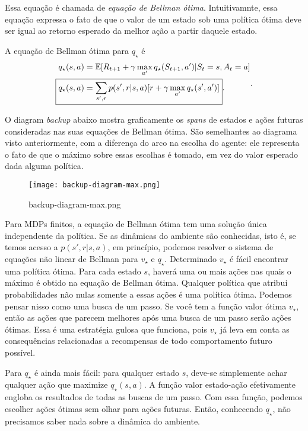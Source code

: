 \documentclass{article}
\begin{document}
Essa equação é chamada de \textit{equação de Bellman ótima}. Intuitivamnte, essa equação expressa o fato de que o valor de um estado sob uma política ótima deve ser igual ao retorno esperado da melhor ação a partir daquele estado.

A equação de Bellman ótima para $q_{\star}$ é
\[
  \begin{align*}
    q_{\star}(s,a) &= \mathbb{E}[R_{t+1} + \gamma \max_{a'} q_{\star}(S_{t+1},a') | S_t = s, A_t = a] \\
    \Aboxed{q_{\star}(s,a) &=\sum_{s',r} p(s',r|s,a)[r+\gamma \max_{a'}q_{\star}(s',a')]}
  .\end{align*}
.\] 

O diagram \textit{backup} abaixo mostra graficamente os \textit{spans} de estados e ações futuras consideradas nas suas equações de Bellman ótima. São semelhantes ao diagrama visto anteriormente, com a diferença do arco na escolha do agente: ele representa o fato de que o máximo sobre essas escolhas é tomado, em vez do valor esperado dada alguma política.

\begin{figure}[htpb]
  \centering
  \texttt{[image: backup-diagram-max.png]}
  \caption{backup-diagram-max.png}
  \label{fig:backup-diagram-max-png}
\end{figure}

Para MDPs finitos, a equação de Bellman ótima tem uma solução única independente da política. Se as dinâmicas do ambiente são conhecidas, isto é, se temos acesso a $p(s',r|s,a)$, em princípio, podemos resolver o sistema de equações não linear de Bellman para $v_{\star}$ e $q_{\star}$. Determinado $v_{\star}$ é fácil encontrar uma política ótima. Para cada estado $s$, haverá uma ou mais ações nas quais o máximo é obtido na equação de Bellman ótima. Qualquer política que atribui probabilidades não nulas somente a essas ações é uma política ótima. Podemos pensar nisso como uma busca de um passo. Se você tem a função valor ótima $v_{\star}$, então as ações que parecem melhores após uma busca de um passo serão ações ótimas. Essa é uma estratégia gulosa que funciona, pois $v_{\star}$ já leva em conta as consequências relacionadas a recompensas de todo comportamento futuro possível. 

Para $q_{\star}$ é ainda mais fácil: para qualquer estado $s$, deve-se simplemente achar qualquer ação que maximize $q_{\star}(s,a)$. A função valor estado-ação efetivamente engloba os resultados de todas as buscas de um passo. Com essa função, podemos escolher ações ótimas sem olhar para ações futuras. Então, conhecendo $q_{\star}$, não precisamos saber nada sobre a dinâmica do ambiente.
\end{document}

